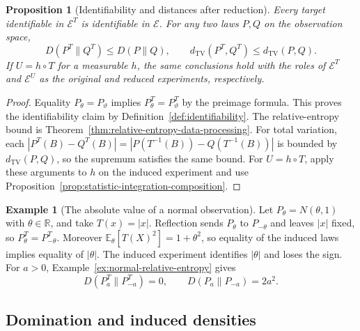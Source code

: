 \documentclass[11pt,oneside]{book}
\newtheorem{proposition}[theorem]{Proposition}
\theoremstyle{definition}
\newtheorem{example}[theorem]{Example}
\theoremstyle{remark}
\newcommand{\R}{\mathbb R}
\begin{document}
\begin{proposition}[Identifiability and distances after reduction]
\label{prop:statistic-information-contraction}
Every target identifiable in $\mathcal E^T$ is identifiable in
$\mathcal E$. For any two laws $P,Q$ on the observation space,
\[
D(P^T\|Q^T)\leq D(P\|Q),\qquad
d_{\mathrm{TV}}(P^T,Q^T)\leq d_{\mathrm{TV}}(P,Q).
\]
If $U=h\circ T$ for a measurable $h$, the same conclusions
hold with the roles of $\mathcal E^T$ and $\mathcal E^U$ as the
original and reduced experiments, respectively.
\end{proposition}
\begin{proof}
Equality $P_\theta=P_\vartheta$ implies $P_\theta^T=P_\vartheta^T$
by the preimage formula. This proves the identifiability claim
by Definition~\ref{def:identifiability}. The relative-entropy
bound is Theorem~\ref{thm:relative-entropy-data-processing}.
For total variation, each
$|P^T(B)-Q^T(B)|=|P(T^{-1}(B))-Q(T^{-1}(B))|$ is bounded by
$d_{\mathrm{TV}}(P,Q)$, so the supremum satisfies the same bound.
For $U=h\circ T$, apply these arguments to $h$ on the induced
experiment and use Proposition~\ref{prop:statistic-integration-composition}.
\end{proof}

\begin{example}[The absolute value of a normal observation]
\label{ex:statistic-folded-normal}
Let $P_\theta=N(\theta,1)$ with $\theta\in\R$, and take $T(x)=|x|$.
Reflection sends $P_\theta$ to $P_{-\theta}$ and leaves $|x|$
fixed, so $P_\theta^T=P_{-\theta}^T$. Moreover
$\mathbb E_\theta[T(X)^2]=1+\theta^2$, so equality of the induced
laws implies equality of $|\theta|$. The induced experiment
identifies $|\theta|$ and loses the sign. For $a>0$,
Example~\ref{ex:normal-relative-entropy} gives
\[
D(P_a^T\|P_{-a}^T)=0,\qquad D(P_a\|P_{-a})=2a^2.
\]
\end{example}

\subsection{Domination and induced densities}
\label{subsec:statistic-induced-densities}
\end{document}

